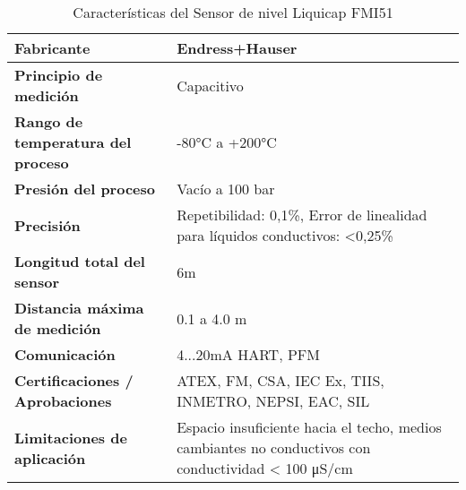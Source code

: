 

\begin{table}[H]
    \centering
    \caption{Características del Sensor de nivel Liquicap FMI51}
    \label{table:sensor_nivel}
    \begin{tabular}{| L{6cm} | L{6cm} |}
        \hline
        \textbf{Fabricante}                       & Endress+Hauser                                                                                      \\
        \hline
        \textbf{Principio de medición}            & Capacitivo                                                                                          \\
        \hline
        \textbf{Rango de temperatura del proceso} & -80°C a +200°C                                                                                      \\
        \hline
        \textbf{Presión del proceso}              & Vacío a 100 bar                                                                                     \\
        \hline
        \textbf{Precisión}                        & Repetibilidad: 0,1\%, Error de linealidad para líquidos conductivos: <0,25\%                        \\
        \hline
        \textbf{Longitud total del sensor}        & 6m                                                                                                  \\
        \hline
        \textbf{Distancia máxima de medición}     & 0.1 a 4.0 m                                                                                         \\
        \hline
        \textbf{Comunicación}                     & 4...20mA HART, PFM                                                                                  \\
        \hline
        \textbf{Certificaciones / Aprobaciones}   & ATEX, FM, CSA, IEC Ex, TIIS, INMETRO, NEPSI, EAC, SIL                                               \\
        \hline
        \textbf{Limitaciones de aplicación}       & Espacio insuficiente hacia el techo, medios cambiantes no conductivos con conductividad < 100 μS/cm \\
        \hline
    \end{tabular}
\end{table}



